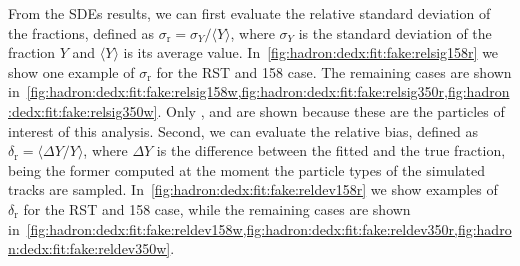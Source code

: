 From the SDEs results, we can first evaluate the relative standard deviation
of the fractions, defined as $\sigma_\text{r} = \sigma_Y/\langle Y\rangle$, where
$\sigma_Y$ is the standard deviation of the fraction $Y$
and $\langle Y \rangle$ is its average value.
In~\cref{fig:hadron:dedx:fit:fake:relsig158r} we show
one example of $\sigma_\text{r}$ for the RST and 158 \GeVc case.
The remaining cases are shown
in~\cref{fig:hadron:dedx:fit:fake:relsig158w,fig:hadron:dedx:fit:fake:relsig350r,fig:hadron:dedx:fit:fake:relsig350w}. Only \pions, \kaons and \protonpm are shown
because these are the particles of interest of this analysis.
Second, we can evaluate the relative bias, defined as
$\delta_\text{r} = \langle \Delta Y/ Y \rangle$, where $\Delta Y$
is the difference between the fitted and the true fraction,
being the former computed at the moment the particle types
of the simulated tracks are sampled.
In~\cref{fig:hadron:dedx:fit:fake:reldev158r} we show examples
of $\delta_\text{r}$ for the RST and 158 \GeVc case, while the remaining
cases are shown
in~\cref{fig:hadron:dedx:fit:fake:reldev158w,fig:hadron:dedx:fit:fake:reldev350r,fig:hadron:dedx:fit:fake:reldev350w}.

